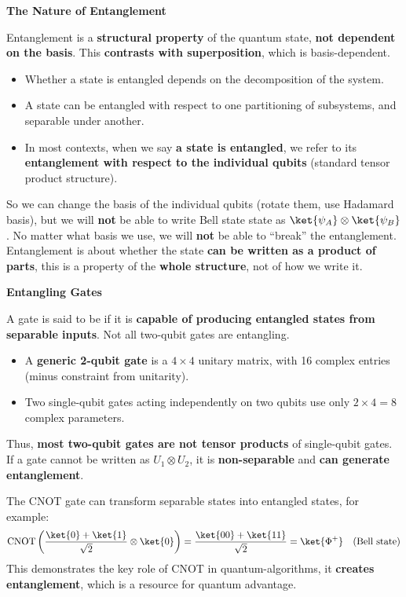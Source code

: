 \highspace
\begin{flushleft}
    \textcolor{Green3}{ \textbf{The Nature of Entanglement}}
\end{flushleft}
Entanglement is a \textbf{structural property} of the quantum state, \textbf{not dependent on the basis}. This \textbf{contrasts with superposition}, which is basis-dependent.
\begin{itemize}
    \item Whether a state is entangled depends on the decomposition of the system.
    \item A state can be entangled with respect to one partitioning of subsystems, and separable under another.
    \item In most contexts, when we say \textbf{a state is entangled}, we refer to its \textbf{entanglement with respect to the individual qubits} (standard tensor product structure).
\end{itemize}
So we can change the basis of the individual qubits (rotate them, use Hadamard basis), but we will \textbf{not} be able to write Bell state state as $\ket{\psi_{A}} \otimes \ket{\psi_{B}}$. No matter what basis we use, we will \textbf{not} be able to ``break'' the entanglement. Entanglement is about whether the state \textbf{can be written as a product of parts}, this is a property of the \textbf{whole structure}, not of how we write it.

\highspace
\begin{flushleft}
    \textcolor{Green3}{ \textbf{Entangling Gates}}
\end{flushleft}
A gate is said to be  if it is \textbf{capable of producing entangled states from separable inputs}. Not all two-qubit gates are entangling.
\begin{itemize}
    \item A \textbf{generic 2-qubit gate} is a $4 \times 4$ unitary matrix, with 16 complex entries (minus constraint from unitarity).
    \item Two single-qubit gates acting independently on two qubits use only $2 \times 4 = 8$ complex parameters.
\end{itemize}
Thus, \textbf{most two-qubit gates are not tensor products} of single-qubit gates. If a gate cannot be written as $U_{1} \otimes U_{2}$, it is \textbf{non-separable} and \textbf{can generate entanglement}.

\begin{examplebox}
    The CNOT gate can transform separable states into entangled states, for example:
    \begin{equation*}
        \text{CNOT}\left( \dfrac{\ket{0} + \ket{1}}{\sqrt{2}} \otimes \ket{0} \right) = \dfrac{\ket{00} + \ket{11}}{\sqrt{2}} = \ket{\Phi^{+}} \quad \text{(Bell state)}
    \end{equation*}
    This demonstrates the key role of CNOT in quantum-algorithms, it \textbf{creates entanglement}, which is a resource for quantum advantage.
\end{examplebox}

